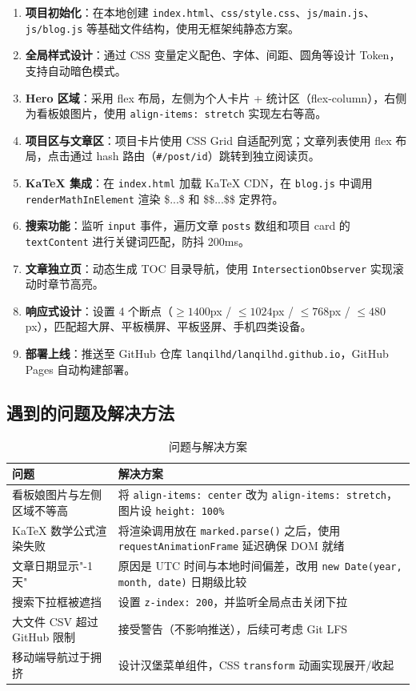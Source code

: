 \documentclass[12pt, a4paper]{article}
\begin{document}
\begin{enumerate}[leftmargin=*]
    \item \textbf{项目初始化}：在本地创建 \texttt{index.html}、\texttt{css/style.css}、\texttt{js/main.js}、\texttt{js/blog.js} 等基础文件结构，使用无框架纯静态方案。
    \item \textbf{全局样式设计}：通过 CSS 变量定义配色、字体、间距、圆角等设计 Token，支持自动暗色模式。
    \item \textbf{Hero 区域}：采用 flex 布局，左侧为个人卡片 + 统计区（flex-column），右侧为看板娘图片，使用 \texttt{align-items: stretch} 实现左右等高。
    \item \textbf{项目区与文章区}：项目卡片使用 CSS Grid 自适配列宽；文章列表使用 flex 布局，点击通过 hash 路由（\texttt{\#/post/id}）跳转到独立阅读页。
    \item \textbf{KaTeX 集成}：在 \texttt{index.html} 加载 KaTeX CDN，在 \texttt{blog.js} 中调用 \texttt{renderMathInElement} 渲染 \$...\$ 和 \$\$...\$\$ 定界符。
    \item \textbf{搜索功能}：监听 \texttt{input} 事件，遍历文章 \texttt{posts} 数组和项目 card 的 \texttt{textContent} 进行关键词匹配，防抖 200ms。
    \item \textbf{文章独立页}：动态生成 TOC 目录导航，使用 \texttt{IntersectionObserver} 实现滚动时章节高亮。
    \item \textbf{响应式设计}：设置 4 个断点（$\ge1400$px / $\le1024$px / $\le768$px / $\le480$px），匹配超大屏、平板横屏、平板竖屏、手机四类设备。
    \item \textbf{部署上线}：推送至 GitHub 仓库 \texttt{lanqilhd/lanqilhd.github.io}，GitHub Pages 自动构建部署。
\end{enumerate}

\subsection{遇到的问题及解决方法}

\begin{table}[H]
\centering
\caption{问题与解决方案}
\begin{tabular}{p{5cm}p{7cm}}
\toprule
\textbf{问题} & \textbf{解决方案} \\
\midrule
看板娘图片与左侧区域不等高 & 将 \texttt{align-items: center} 改为 \texttt{align-items: stretch}，图片设 \texttt{height: 100\%} \\
KaTeX 数学公式渲染失败 & 将渲染调用放在 \texttt{marked.parse()} 之后，使用 \texttt{requestAnimationFrame} 延迟确保 DOM 就绪 \\
文章日期显示"-1 天" & 原因是 UTC 时间与本地时间偏差，改用 \texttt{new Date(year, month, date)} 日期级比较 \\
搜索下拉框被遮挡 & 设置 \texttt{z-index: 200}，并监听全局点击关闭下拉 \\
大文件 CSV 超过 GitHub 限制 & 接受警告（不影响推送），后续可考虑 Git LFS \\
移动端导航过于拥挤 & 设计汉堡菜单组件，CSS \texttt{transform} 动画实现展开/收起 \\
\bottomrule
\end{tabular}
\end{table}
\end{document}
